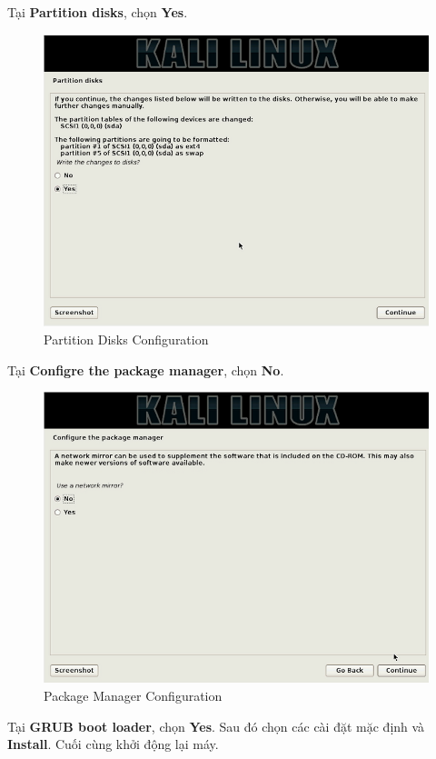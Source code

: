  Tại \textbf{Partition disks}, chọn \textbf{Yes}.

\begin{figure}[!htb]
    \centering
    \includegraphics[width=0.85\linewidth]{figure//chapter5//lab5_1/partition_disk.png}
    \caption{Partition Disks Configuration}
    \label{fig:enter-label}
\end{figure}

 Tại \textbf{Configre the package manager}, chọn \textbf{No}.

\begin{figure}[!htb]
    \centering
    \includegraphics[width=0.85\linewidth]{figure//chapter5//lab5_1/package_manager.png}
    \caption{Package Manager Configuration}
    \label{fig:enter-label}
\end{figure}

\newpage

 Tại \textbf{GRUB boot loader}, chọn \textbf{Yes}. Sau đó chọn các cài đặt mặc định và \textbf{Install}. Cuối cùng khởi động lại máy.

